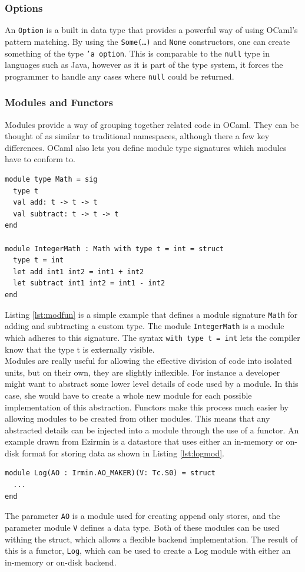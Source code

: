 \documentclass[12pt,a4paper,twoside,openright]{report}
\begin{document}
	\subsubsection*{Options}
	An \texttt{Option} is a built in data type that provides a powerful way of using OCaml's pattern matching.
	By using the \texttt{Some(\ldots)} and \texttt{None} constructors, one can create something of the type \texttt{'a option}. 
	This is comparable to the \texttt{null} type in languages such as Java, however as it is part of the type system, it forces the programmer to handle any cases where \texttt{null} could be returned. 

	\subsubsection*{Modules and Functors}
	Modules provide a way of grouping together related code in OCaml.
	They can be thought of as similar to traditional namespaces, although there a few key differences.
	OCaml also lets you define module type signatures which modules have to conform to.
	\begin{lstlisting}[caption={OCaml Modules and Functors},label={lst:modfun}]
module type Math = sig
  type t
  val add: t -> t -> t
  val subtract: t -> t -> t
end

module IntegerMath : Math with type t = int = struct 
  type t = int
  let add int1 int2 = int1 + int2
  let subtract int1 int2 = int1 - int2
end
	\end{lstlisting}
	Listing \ref{lst:modfun} is a simple example that defines a module signature \texttt{Math} for adding and subtracting a custom type.
	The module \texttt{IntegerMath} is a module which adheres to this signature. 
	The syntax \texttt{with type t = int} lets the compiler know that the type t is externally visible.\\

	Modules are really useful for allowing the effective division of code into isolated units, but on their own, they are slightly inflexible. 
	For instance a developer might want to abstract some lower level details of code used by a module.
	In this case, she would have to create a whole new module for each possible implementation of this abstraction.
	Functors make this process much easier by allowing modules to be created from other modules. 
	This means that any abstracted details can be injected into a module through the use of a functor.
	An example drawn from Ezirmin is a datastore that uses either an in-memory or on-disk format for storing data as shown in Listing \ref{lst:logmod}.
	\begin{lstlisting}[caption={Ezirmin Log Module},label={lst:logmod}]
module Log(AO : Irmin.AO_MAKER)(V: Tc.S0) = struct
  ...
end
	\end{lstlisting}
	The parameter \texttt{AO} is a module used for creating append only stores, and the parameter module \texttt{V} defines a data type.
	Both of these modules can be used withing the struct, which allows a flexible backend implementation.
	The result of this is a functor, \texttt{Log}, which can be used to create a Log module with either an in-memory or on-disk backend.
\end{document}

